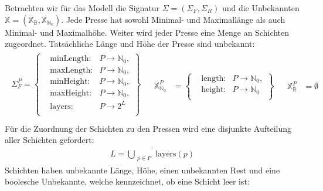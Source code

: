 Betrachten wir für das Modell die Signatur $\Sigma = \left( \Sigma_F, \Sigma_R \right)$ und die Unbekannten $\mathbb{X} = (\mathbb{X}_{\mathbb{B}}, \mathbb{X}_{\mathbb{N}_0})$.
Jede Presse hat sowohl Minimal- und Maximallänge als auch Minimal- und Maximalhöhe.
Weiter wird jeder Presse eine Menge an Schichten zugeordnet.
Tatsächliche Länge und Höhe der Presse sind unbekannt:
\[
    \begin{array}{lll}
        \begin{aligned}
            \Sigma_{F}^{P} = \left\{
            \begin{aligned}
                & \text{minLength}: & P \rightarrow \mathbb{N}_0, \\
                & \text{maxLength}: & P \rightarrow \mathbb{N}_0, \\
                & \text{minHeight}: & P \rightarrow \mathbb{N}_0, \\
                & \text{maxHeight}: & P \rightarrow \mathbb{N}_0, \\
                & \text{layers}: & P \rightarrow 2^{L} \; \\
            \end{aligned} \right\} \\[5pt]
        \end{aligned}
        &
        \begin{aligned}
            \mathbb{X}_{\mathbb{N}_0}^{P} &= \left\{
                \begin{aligned}
                    & \text{length}: & P \rightarrow \mathbb{N}_0, \\
                    & \text{height}: & P \rightarrow \mathbb{N}_0 \; \\
                \end{aligned} \right\}
        \end{aligned}
        &
        \begin{aligned}
            \mathbb{X}_{\mathbb{B}}^{P} &= \emptyset
        \end{aligned}
    \end{array}
\]
Für die Zuordnung der Schichten zu den Pressen wird eine disjunkte Aufteilung aller Schichten gefordert:
\begin{align}
    L = \dot{\bigcup_{\substack{p \in P}}} \text{layers}(p) \label{constraint:disjointLayers}
\end{align}
Schichten haben unbekannte Länge, Höhe, einen unbekannten Rest und eine boolesche Unbekannte, welche kennzeichnet, ob eine Schicht leer ist:
